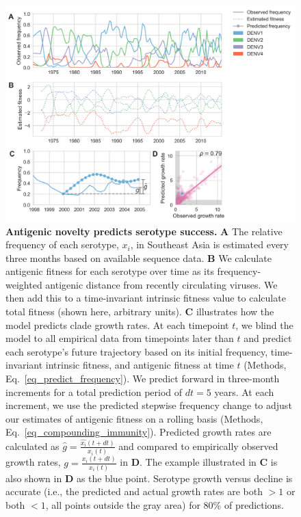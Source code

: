 \begin{figure}[h]
  \begin{centering}
    \includegraphics[width=\linewidth]{./png/serotype_fitness_model.png}
  	\caption{\textbf{Antigenic novelty predicts serotype success.}
    \textbf{A} The relative frequency of each serotype, $x_i$, in Southeast Asia is estimated every three months based on available sequence data.
    \textbf{B} We calculate antigenic fitness for each serotype over time as its frequency-weighted antigenic distance from recently circulating viruses.
    We then add this to a time-invariant intrinsic fitness value to calculate total fitness (shown here, arbitrary units).
    \textbf{C} illustrates how the model predicts clade growth rates.
    At each timepoint $t$, we blind the model to all empirical data from timepoints later than $t$ and predict each serotype's future trajectory based on its initial frequency, time-invariant intrinsic fitness, and antigenic fitness at time $t$ (Methods, Eq.~\ref{eq_predict_frequency}).
    We predict forward in three-month increments for a total prediction period of $dt = 5$ years.
    At each increment, we use the predicted stepwise frequency change to adjust our estimates of antigenic fitness on a rolling basis (Methods, Eq.~\ref{eq_compounding_immunity}).
    Predicted growth rates are calculated as $\hat{g} = \frac{\hat{x_i}(t+dt)}{x_i(t)}$ and compared to empirically observed growth rates, $g = \frac{x_i(t+dt)}{x_i(t)}$ in \textbf{D}.
    The example illustrated in \textbf{C} is also shown in \textbf{D} as the blue point.
    Serotype growth versus decline is accurate (i.e., the predicted and actual growth rates are both $>1$ or both $<1$, all points outside the gray area) for 80\% of predictions.
    }
  	\label{serotype_fitness_model}
  \end{centering}
\end{figure}

